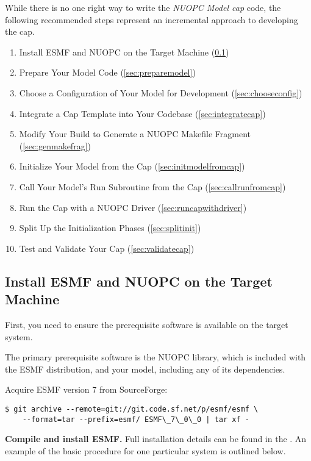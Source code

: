 
\label{sec:approach}

While there is no one right way to write the \emph{NUOPC Model cap} code, the following
recommended steps represent an incremental approach to developing the cap.
\begin{enumerate}
\item Install ESMF and NUOPC on the Target Machine (\ref{sec:installesmf})
\item Prepare Your Model Code (\ref{sec:preparemodel})
\item Choose a Configuration of Your Model for Development (\ref{sec:chooseconfig})
\item Integrate a Cap Template into Your Codebase (\ref{sec:integratecap})
\item Modify Your Build to Generate a NUOPC Makefile Fragment (\ref{sec:genmakefrag})
\item Initialize Your Model from the Cap (\ref{sec:initmodelfromcap})
\item Call Your Model's Run Subroutine from the Cap (\ref{sec:callrunfromcap})
\item Run the Cap with a NUOPC Driver (\ref{sec:runcapwithdriver})
\item Split Up the Initialization Phases (\ref{sec:splitinit})
\item Test and Validate Your Cap (\ref{sec:validatecap})
\end{enumerate}

\subsection{Install ESMF and NUOPC on the Target Machine}
\label{sec:installesmf}
First, you need to ensure the prerequisite
software is available on the target system.

The primary prerequisite software is the NUOPC library, which is
included with the ESMF distribution, and your model, including
any of its dependencies.

Acquire ESMF version 7 from SourceForge:

\begin{verbatim}
$ git archive --remote=git://git.code.sf.net/p/esmf/esmf \ 
    --format=tar --prefix=esmf/ ESMF\_7\_0\_0 | tar xf - 
\end{verbatim}

\textbf{Compile and install ESMF.}  Full installation details can be found in the .  An example of the basic procedure
for one particular system is outlined below.

